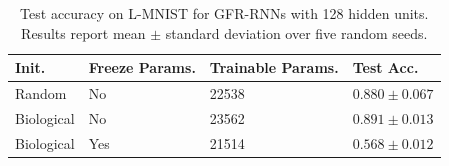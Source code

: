 \begin{table}[htp]
    \caption{Test accuracy on L-MNIST for GFR-RNNs with 128 hidden units. Results report mean $\pm$ standard deviation over five random seeds.}
    \label{tab:bio-lmnist-reproduced}
    \centering
    \begin{tabular}{llll}
    \toprule
    \textbf{Init.} & \textbf{Freeze Params.} & \textbf{Trainable Params.} & \textbf{Test Acc.} \\
    \midrule
    Random & No & 22538 & $0.880 \pm 0.067$ \\
    Biological & No & 23562 & $0.891 \pm 0.013$ \\
    Biological & Yes & 21514 & $0.568 \pm 0.012$ \\
    \bottomrule
    \end{tabular}
\end{table}
